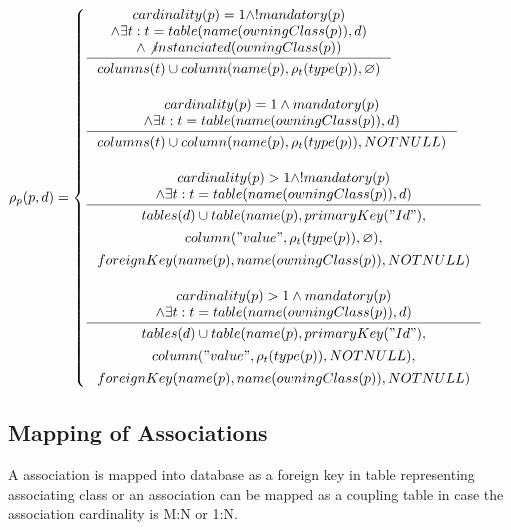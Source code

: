 \documentclass[11pt]{article}
\begin{document}
$\rho_p(p, d) = \begin{cases}
  \inference{cardinality(p) = 1 \wedge ! mandatory(p)
 \\ \wedge \exists t : t = table(name(owningClass(p)), d) 
 \\ \wedge \not instanciated(owningClass(p))
 }{\begin{gathered}
	  columns(t) \cup column(name(p), \rho_t(type(p)), \varnothing )
\end{gathered}
 } \\ \\

  \inference{cardinality(p) = 1 \wedge mandatory(p)
 \\ \wedge \exists t : t = table(name(owningClass(p)), d)}{\begin{gathered}
 	 columns(t) \cup column(name(p), \rho_t(type(p)), NOTNULL ) \\ 
\end{gathered}} 
\\ \\
 
 \inference{ cardinality(p) > 1 \wedge ! mandatory(p) \\ \wedge \exists t : t = table(name(owningClass(p)), d)}{\begin{gathered}tables(d) \cup  table(name(p), primaryKey("Id"), \\ column("value", \rho_t(type(p)), \varnothing), \\ foreignKey(name(p), name(owningClass(p)), NOTNULL) \\
\end{gathered}}
\\ \\

 \inference{ cardinality(p) > 1 \wedge mandatory(p) \\ \wedge \exists t : t = table(name(owningClass(p)), d) }{\begin{gathered} tables(d) \cup  table(name(p), primaryKey("Id"), \\ column("value", \rho_t(type(p)), NOTNULL), \\ foreignKey(name(p), name(owningClass(p)), NOTNULL)
	 \end{gathered}}
 \end{cases}$

\subsection{Mapping of Associations}
A association is mapped into database as a foreign key in table representing associating class or an association can be mapped as a coupling table in case the association cardinality is M:N or 1:N.
\end{document}
